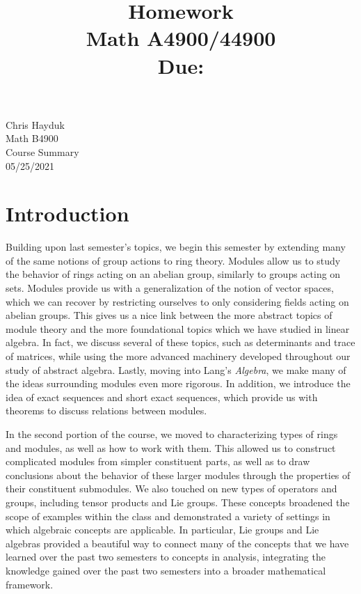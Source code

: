 \documentclass[11pt, reqno]{amsart}
\title[Homework \HW]{Homework \HW \\
Math A4900/44900\\
\small Due: \DUE}
\author{}
\theoremstyle{plain}
\theoremstyle{definition}
\theoremstyle{example}
\def\DUE{05/25/2021}
\begin{document}
\begin{flushright}
Chris Hayduk\\
Math B4900\\
Course Summary\\
\DUE
\end{flushright}

\section{Introduction}

Building upon last semester's topics, we begin this semester by extending many of the same notions of group actions to ring theory. Modules allow us to study the behavior of rings acting on an abelian group, similarly to groups acting on sets. Modules provide us with a generalization of the notion of vector spaces, which we can recover by restricting ourselves to only considering fields acting on abelian groups. This gives us a nice link between the more abstract topics of module theory and the more foundational topics which we have studied in linear algebra. In fact, we discuss several of these topics, such as determinants and trace of matrices, while using the more advanced machinery developed throughout our study of abstract algebra. Lastly, moving into Lang's \textit{Algebra}, we make many of the ideas surrounding modules even more rigorous. In addition, we introduce the idea of exact sequences and short exact sequences, which provide us with theorems to discuss relations between modules.

\par
In the second portion of the course, we moved to characterizing types of rings and modules, as well as how to work with them. This allowed us to construct complicated modules from simpler constituent parts, as well as to draw conclusions about the behavior of these larger modules through the properties of their constituent submodules. We also touched on new types of operators and groups, including tensor products and Lie groups. These concepts broadened the scope of examples within the class and demonstrated a variety of settings in which algebraic concepts are applicable. In particular, Lie groups and Lie algebras provided a beautiful way to connect many of the concepts that we have learned over the past two semesters to concepts in analysis, integrating the knowledge gained over the past two semesters into a broader mathematical framework.
\end{document}
